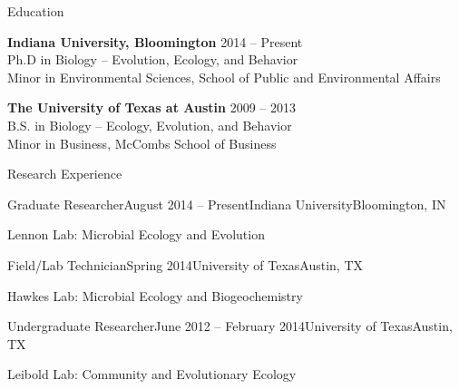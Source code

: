 \documentclass{resume} %
\begin{document}

\begin{rSection}{Education}

{\bf Indiana University, Bloomington} \hfill {2014 -- Present} \\
Ph.D in Biology -- Evolution, Ecology, and Behavior \\
Minor in Environmental Sciences, School of Public and Environmental Affairs

{\bf The University of Texas at Austin} \hfill {2009 -- 2013} \\
B.S. in Biology -- Ecology, Evolution, and Behavior \\
Minor in Business, McCombs School of Business \\

\end{rSection}


\begin{rSection}{Research Experience}


\begin{rSubsection}{Graduate Researcher}{August 2014 -- Present}{Indiana University}{Bloomington, IN}
\item Lennon Lab: Microbial Ecology and Evolution
\end{rSubsection}

\begin{rSubsection}{Field/Lab Technician}{Spring 2014}{University of Texas}{Austin, TX}
\item Hawkes Lab: Microbial Ecology and Biogeochemistry
\end{rSubsection}

\begin{rSubsection}{Undergraduate Researcher}{June 2012 -- February 2014}{University of Texas}{Austin, TX}
\item Leibold Lab: Community and Evolutionary Ecology
\end{rSubsection}

\end{rSection}

\end{document}
